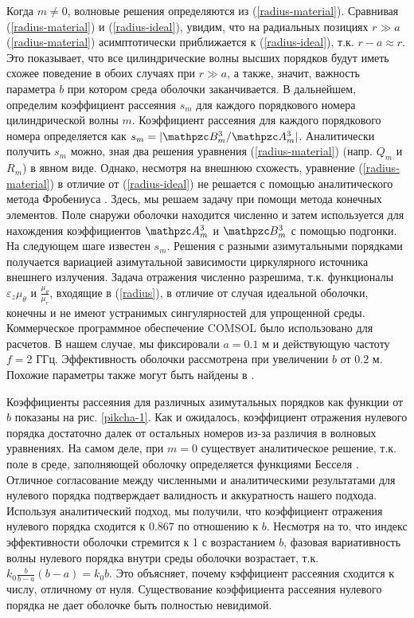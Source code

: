 \documentclass[12pt]{article}
\begin{document}
Когда $m \ne 0$, волновые решения определяются из
(\ref{radius-material}). Сравнивая (\ref{radius-material}) и
(\ref{radius-ideal}), увидим, что на радиальных позициях $r \gg a$
(\ref{radius-material}) асимптотически приближается к
(\ref{radius-ideal}), т.к. $r - a \approx r$. Это показывает, что все
цилиндрические волны высших порядков будут иметь схожее поведение в
обоих случаях при $r \gg a$, а также, значит, важность параметра $b$
при котором среда оболочки заканчивается. В дальнейшем, определим
коэффициент рассеяния $s_m$ для каждого порядкового номера
цилиндрической волны $m$. Коэффициент рассеяния для каждого
порядкового номера определяется как $s_m = |\mathpzc B_m^3 / \mathpzc
A_m^3|$. Аналитически получить $s_m$ можно, зная два решения уравнения
(\ref{radius-material}) (напр. $Q_m$ и $R_m$) в явном виде. Однако,
несмотря на внешнюю схожесть, уравнение (\ref{radius-material}) в
отличие от (\ref{radius-ideal}) не решается с помощью аналитического
метода Фробениуса \cite{13}. Здесь, мы решаем задачу при помощи метода
конечных элементов. Поле снаружи оболочки находится численно и затем
используется для нахождения коэффициентов $\mathpzc A_m^3$ и $\mathpzc
B_m^3$ с помощью подгонки. На следующем шаге известен $s_m$. Решения с
разными азимутальными порядками получается вариацией азимутальной
зависимости циркулярного источника внешнего излучения. Задача
отражения численно разрешима, т.к. функционалы $\varepsilon_z
\mu_\theta$ и $\frac{\mu_\theta}{\mu_r}$, входящие в (\ref{radius}), в
отличие от случая идеальной оболочки, конечны и не имеют устранимых
сингулярностей для упрощенной среды. Коммерческое программное
обеспечение COMSOL было использовано для расчетов. В нашем случае, мы
фиксировали $a = 0.1$ м и действующую частоту $f = 2$
ГГц. Эффективность оболочки рассмотрена при увеличении $b$ от $0.2$
м. Похожие параметры также могут быть найдены в \cite{14}.

Коэффициенты рассеяния для различных азимутальных порядков как функции
от $b$ показаны на рис. \ref{pikcha-1}. Как и ожидалось, коэффициент
отражения нулевого порядка достаточно далек от остальных номеров из-за
различия в волновых уравнениях. На самом деле, при $m = 0$ существует
аналитическое решение, т.к. поле в среде, заполняющей оболочку
определяется функциями Бесселя \cite{11}. Отличное согласование между
численными и аналитическими результатами для нулевого порядка
подтверждает валидность и аккуратность нашего подхода. Используя
аналитический подход, мы получили, что коэффициент отражения нулевого
порядка сходится к $0.867$ по отношению к $b$. Несмотря на то, что
индекс эффективности оболочки стремится к 1 с возрастанием $b$, фазовая
вариативность волны нулевого порядка внутри среды оболочки возрастает,
т.к. $k_0 \frac{b}{b - a} (b - a) = k_0 b$. Это объясняет, почему
кэффициент рассеяния сходится к числу, отличному от нуля.
Существование коэффициента рассеяния нулевого порядка не дает оболочке
быть полностью невидимой.
\end{document}
